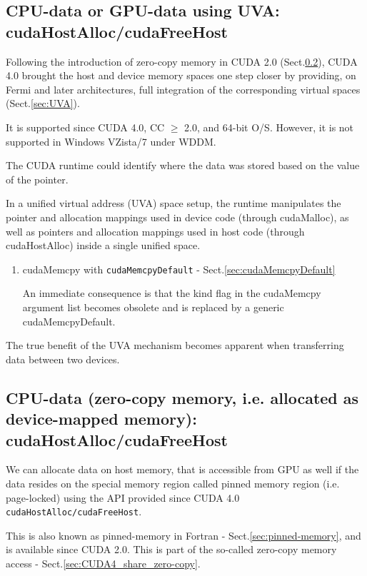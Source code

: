 \subsection{CPU-data or GPU-data using UVA: cudaHostAlloc/cudaFreeHost}

Following the introduction of zero-copy memory in CUDA 2.0
(Sect.\ref{sec:device-mapped-memory}), CUDA 4.0 brought the host and device
memory spaces one step closer by providing, on Fermi and later architectures,
full integration of the corresponding virtual spaces (Sect.\ref{sec:UVA}).

It is supported since CUDA 4.0, CC $\ge$ 2.0, and 64-bit O/S.
However, it is not supported in Windows VZista/7 under WDDM.

The CUDA runtime could identify where the data was stored based on the value of
the pointer.

In a unified virtual address (UVA) space setup, the runtime manipulates the
pointer and allocation mappings used in device code (through cudaMalloc), as
well as pointers and allocation mappings used in host code (through
cudaHostAlloc) inside a single unified space.

\begin{enumerate}
  \item cudaMemcpy with \verb!cudaMemcpyDefault! - Sect.\ref{sec:cudaMemcpyDefault}

An immediate consequence is that the kind flag in the cudaMemcpy argument list
becomes obsolete and is replaced by a generic cudaMemcpyDefault.

\end{enumerate}

The true benefit of the UVA mechanism becomes apparent when transferring data between two devices. 
 

\subsection{CPU-data (zero-copy memory, i.e. allocated as device-mapped memory): cudaHostAlloc/cudaFreeHost}
\label{sec:device-mapped-memory}
\label{sec:cudaHostAlloc} 
\label{sec:cudaFreeHost}

We can allocate data on host memory, that is accessible from GPU as well
if the data resides on the special memory region called pinned
memory region (i.e. page-locked) using the API provided since CUDA 4.0
\verb!cudaHostAlloc/cudaFreeHost!.

This is also known as pinned-memory in Fortran - Sect.\ref{sec:pinned-memory},
and is available since CUDA 2.0. This is part of the so-called zero-copy memory
access - Sect.\ref{sec:CUDA4_share_zero-copy}.



